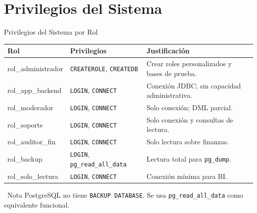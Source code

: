 \documentclass[aspectratio=169]{beamer}
\begin{document}
\section{Privilegios del Sistema}

\begin{frame}{Privilegios del Sistema por Rol}
    \centering
    \scriptsize
    \begin{tabular}{>{\ttfamily\raggedright\arraybackslash}p{3.5cm} >{\raggedright\arraybackslash}p{3.8cm} >{\raggedright\arraybackslash}p{5.5cm}}
        \toprule
        \textbf{Rol} & \textbf{Privilegios} & \textbf{Justificación} \\
        \midrule
        rol\_administrador & \texttt{CREATEROLE}, \texttt{CREATEDB} & Crear roles personalizados y bases de prueba. \\
        \midrule
        rol\_app\_backend & \texttt{LOGIN}, \texttt{CONNECT} & Conexión JDBC; sin capacidad administrativa. \\
        \midrule
        rol\_moderador & \texttt{LOGIN}, \texttt{CONNECT} & Solo conexión; DML parcial. \\
        \midrule
        rol\_soporte & \texttt{LOGIN}, \texttt{CONNECT} & Solo conexión y consultas de lectura. \\
        \midrule
        rol\_auditor\_fin & \texttt{LOGIN}, \texttt{CONNECT} & Solo lectura sobre finanzas. \\
        \midrule
        rol\_backup & \texttt{LOGIN}, \texttt{pg\_read\_all\_data} & Lectura total para \texttt{pg\_dump}. \\
        \midrule
        rol\_solo\_lectura & \texttt{LOGIN}, \texttt{CONNECT} & Conexión mínima para BI. \\
        \bottomrule
    \end{tabular}

    \vspace{0.3cm}
    \begin{alertblock}{\faInfoCircle\ Nota}
        PostgreSQL no tiene \texttt{BACKUP DATABASE}. Se usa \texttt{pg\_read\_all\_data} como equivalente funcional.
    \end{alertblock}
\end{frame}

\end{document}
